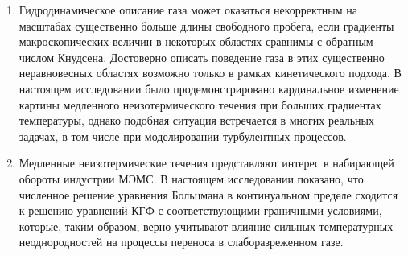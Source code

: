 \begin{enumerate}
\item Гидродинамическое описание газа может оказаться некорректным на масштабах существенно больше длины свободного пробега,
если градиенты макроскопических величин в некоторых областях сравнимы с обратным числом Кнудсена.
Достоверно описать поведение газа в этих существенно неравновесных областях
возможно только в рамках кинетического подхода.
В настоящем исследовании было продемонстрировано кардинальное изменение картины
медленного неизотермического течения при больших градиентах температуры,
однако подобная ситуация встречается в многих реальных задачах,
в том числе при моделировании турбулентных процессов.

\item Медленные неизотермические течения представляют интерес в набирающей обороты индустрии МЭМС.
В настоящем исследовании показано, что численное решение уравнения Больцмана в континуальном пределе
сходится к решению уравнений КГФ с соответствующими граничными условиями,
которые, таким образом, верно учитывают влияние сильных температурных
неоднородностей на процессы переноса в слаборазреженном газе.

\end{enumerate}
